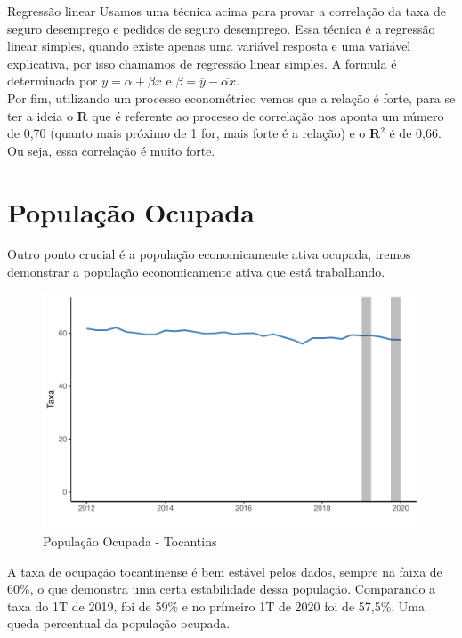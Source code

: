 \begin{smbox}[label={labelbox},nameref={Desigualdade por gênero}]{Regressão linear}
	Usamos uma técnica acima para provar a correlação da taxa de seguro desemprego e pedidos de seguro desemprego. Essa técnica é a regressão linear simples, quando existe apenas uma variável resposta e uma variável explicativa, por isso chamamos de regressão linear simples. A formula é determinada por $y = \alpha + \beta x$ e $\beta = \overline{y} - \overline{\alpha x}$.
	\\
	Por fim, utilizando um processo econométrico vemos que a relação é forte, para se ter a ideia o \textbf{R} que é referente ao processo de correlação nos aponta um número de 0,70 (quanto mais próximo de 1 for, mais forte é a relação) e o \textbf{R}$^{2}$ é de 0,66. Ou seja, essa correlação é muito forte. 
\end{smbox}

\section{População Ocupada}

\par Outro ponto crucial é a população economicamente ativa ocupada, iremos demonstrar a população economicamente ativa que está trabalhando.

\begin{figure}[h]
	\caption{População Ocupada - Tocantins}
	\includegraphics[width=\linewidth]{fig/População Ocupada.pdf}
\end{figure}

\par  A taxa de ocupação tocantinense é bem estável pelos dados, sempre na faixa de 60\%, o que demonstra uma certa estabilidade dessa população. Comparando a taxa do 1T de 2019, foi de 59\% e no prímeiro 1T de 2020 foi de 57,5\%. Uma queda percentual da população ocupada.

